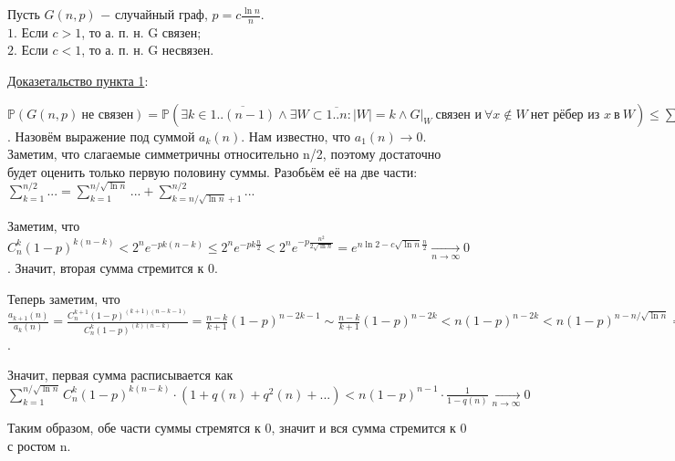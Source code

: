 \Th Пусть $G(n, p)$ $-$ случайный граф, $p = c \frac{\ln n}{n}$. \\
$1.$ Если $c > 1$, то а. п. н. G связен; \\
$2.$ Если $c < 1$, то а. п. н. G несвязен.

\underline{Доказетальство пункта 1}:

\Proof $\mathbb{P}(G(n, p)\: \text{не связен}) = \mathbb{P}(\exists k \in \overline{1..(n-1)}\! \wedge\! \exists W \subset \overline{1..n}: |W|=k\! \wedge\! G \big|_W\: \text{связен и}\: \forall x \notin W\: \text{нет рёбер из } x\: \text{в}\: W) \leqslant \sum^{n-1}_{k=1} \sum_{W:|W|=k} \mathbb{P}(\forall x \notin W \forall y \in W (\{ x, y\} \notin E)) = \sum^{n-1}_{k=1}C^k_n(1-p)^{k(n-k)}$. Назовём выражение под суммой $a_k(n)$. Нам известно, что $a_1(n) \rightarrow 0$. Заметим, что слагаемые симметричны относительно n/2, поэтому достаточно будет оценить только первую половину суммы. Разобьём её на две части: $\sum^{n/2}_{k=1}... = \sum^{n/\sqrt{\ln n}}_{k=1}... + \sum^{n / 2}_{k=n/\sqrt{\ln n} + 1}...$

Заметим, что $C^k_n(1-p)^{k(n-k)} < 2^n e^{-pk(n-k)} \leqslant 2^n e^{-pk\frac{n}{2}} < 2^n e ^{-p \frac{n^2}{2 \sqrt{\ln n}}} = e^{n \ln 2 - c\sqrt{\ln n} \frac{n}{2}} \xrightarrow[n \rightarrow \infty]{} 0$. Значит, вторая сумма стремится к 0.

Теперь заметим, что $\frac{a_{k+1}(n)}{a_k(n)} = \frac{C^{k+1}_n(1-p)^{(k+1)(n-k-1)}} {C^{k}_n(1-p)^{(k)(n-k)}} = \frac{n-k}{k+1}(1-p)^{n-2k-1} \sim \frac{n-k}{k+1}(1-p)^{n-2k} < n(1-p)^{n-2k} < n(1-p)^{n - n / \sqrt{\ln n}}=q(n)$.

Значит, первая сумма расписывается как $\sum^{n / \sqrt{\ln n}}_{k=1} C^k_n (1-p)^{k(n-k)} \cdot (1 + q(n) + q^2(n) + ...) < n(1-p)^{n-1} \cdot \frac{1}{1-q(n)} \xrightarrow[n \rightarrow\infty]{} 0$

Таким образом, обе части суммы стремятся к 0, значит и вся сумма стремится к 0 с ростом n. \EndProof
